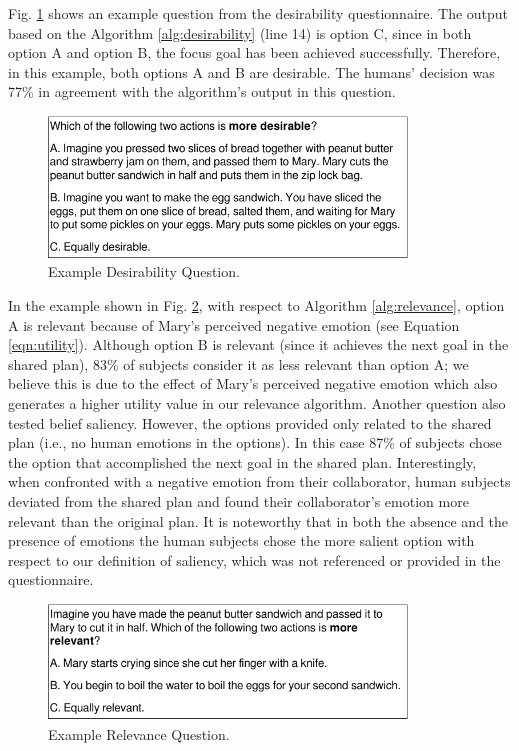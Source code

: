 \documentclass[12pt]{report}
\begin{document}
Fig. \ref{fig:qs3} shows an example question from the desirability
questionnaire. The output based on the Algorithm \ref{alg:desirability}
(line 14) is option C, since in both option A and option B, the focus goal
has been achieved successfully. Therefore, in this example, both options A and B
are desirable. The humans' decision was 77\% in agreement with the algorithm's
output in this question.

\begin{figure}[tbh]
  \vspace{-4mm}
  \centering
  \includegraphics[width=0.85\textwidth]{figure/question-sample3-croped.pdf}
  \caption{{\fontsize{9}{9}\selectfont Example Desirability Question.}}
  \label{fig:qs3}
  \vspace{-5mm}
\end{figure}

In the example shown in Fig. \ref{fig:qs4}, with respect to Algorithm
\ref{alg:relevance}, option A is relevant because of Mary's perceived negative
emotion (see Equation \ref{eqn:utility}). Although option B is relevant (since
it achieves the next goal in the shared plan), 83\% of subjects consider it as
less relevant than option A; we believe this is due to the effect of Mary's
perceived negative emotion which also generates a higher utility value in our
relevance algorithm. Another question also tested belief saliency. However, the
options provided only related to the shared plan (i.e., no human emotions in the
options). In this case 87\% of subjects chose the option that accomplished the
next goal in the shared plan. Interestingly, when confronted with a negative
emotion from their collaborator, human subjects deviated from the shared plan
and found their collaborator's emotion more relevant than the original plan. It
is noteworthy that in both the absence and the presence of emotions the human
subjects chose the more salient option with respect to our definition of
saliency, which was not referenced or provided in the questionnaire.

\begin{figure}[tbh]
  \centering
  \includegraphics[width=0.85\textwidth]{figure/question-sample4-croped.pdf}
  \caption{{\fontsize{9}{9}\selectfont Example Relevance Question.}}
  \label{fig:qs4}
  \vspace{-5mm}
\end{figure}
\end{document}
